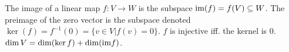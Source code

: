 The image of a linear map $f : V \to W$ is the subspace $\text{im}(f) = f(V) \subseteq W$. The preimage of the zero vector is the subspace denoted $\ker(f) = f^{-1}(0) = \{v \in V | f(v)=0\}$.
 $f$ is injective iff. the kernel is 0. %
 $\dim V = \dim(\ker f) + \dim(\text{im} f)$.
